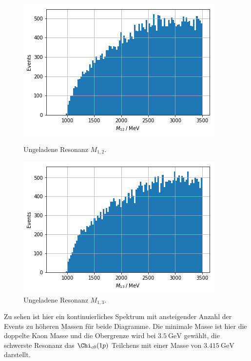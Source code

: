 \begin{figure}[htb]
  \centering
    \includegraphics[width=\linewidth]{plots/sim_twobody_resonance_m12.png}
    \caption{Ungeladene Resonanz $M_{1,2}$.\label{fig:m12}}
  \endminipage\hfill
    \includegraphics[width=\linewidth]{plots/sim_twobody_resonance_m13.png}
    \caption{Ungeladene Resonanz $M_{1,3}$.\label{fig:m13}}
  \endminipage
  \label{fig:resonances}
\end{figure}
Zu sehen ist hier ein kontinuierliches Spektrum mit ansteigender Anzahl der Events zu h\"oheren Massen f\"ur beide Diagramme.
Die minimale Masse ist hier die doppelte Kaon Masse und die Obergrenze wird bei $\SI{3.5}{\giga\electronvolt}$ gew\"ahlt, die schwerste Resonanz das $\Chi_{c0}(1p)$ Teilchens mit einer Masse von $\SI{3.415}{\giga\electronvolt}$ darstellt.

